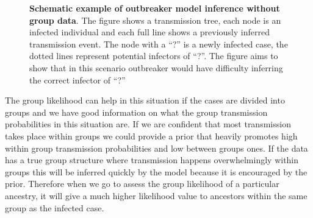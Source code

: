 \documentclass[11pt,a4paper]{report}
\begin{document}
\begin{figure}[h!]
\centering
{} \newline

\caption{{\bf Schematic example of outbreaker model inference without group data}. The figure shows a transmission tree, each node is an infected individual and each full line shows a previously inferred transmission event. The node with a ``?'' is a newly infected case, the dotted lines represent potential infectors of ``?''. The figure aims to show that in this scenario outbreaker would have difficulty inferring the correct infector of ``?''}
\end{figure}
The group likelihood can help in this situation if the cases are divided into groups and we have good information on what the group transmission probabilities in this situation are. If we are confident that most transmission takes place within groups we could provide a prior that heavily promotes high within group transmission probabilities and low between groups ones. If the data has a true group structure where transmission happens overwhelmingly within groups this will be inferred quickly by the model because it is encouraged by the prior. Therefore when we go to assess the group likelihood of a particular ancestry, it will give a much higher likelihood value to ancestors within the same group as the infected case. 
\end{document}
